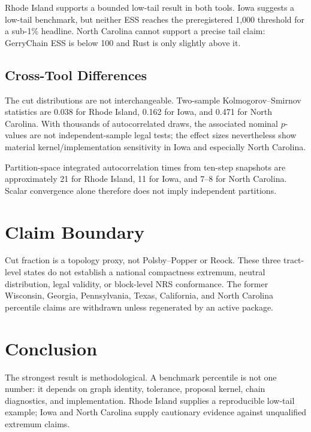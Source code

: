 Rhode Island supports a bounded low-tail result in both tools. Iowa suggests a
low-tail benchmark, but neither ESS reaches the preregistered 1,000 threshold
for a sub-1\% headline. North Carolina cannot support a precise tail claim:
GerryChain ESS is below 100 and Rust is only slightly above it.

\subsection{Cross-Tool Differences}

The cut distributions are not interchangeable. Two-sample Kolmogorov--Smirnov
statistics are 0.038 for Rhode Island, 0.162 for Iowa, and 0.471 for North
Carolina. With thousands of autocorrelated draws, the associated nominal
$p$-values are not independent-sample legal tests; the effect sizes nevertheless
show material kernel/implementation sensitivity in Iowa and especially North
Carolina.

Partition-space integrated autocorrelation times from ten-step snapshots are
approximately 21 for Rhode Island, 11 for Iowa, and 7--8 for North Carolina.
Scalar convergence alone therefore does not imply independent partitions.

\section{Claim Boundary}

Cut fraction is a topology proxy, not Polsby--Popper or Reock. These three
tract-level states do not establish a national compactness extremum, neutral
distribution, legal validity, or block-level NRS conformance. The former
Wisconsin, Georgia, Pennsylvania, Texas, California, and North Carolina
percentile claims are withdrawn unless regenerated by an active package.

\section{Conclusion}

The strongest result is methodological. A benchmark percentile is not one
number: it depends on graph identity, tolerance, proposal kernel, chain
diagnostics, and implementation. Rhode Island supplies a reproducible
low-tail example; Iowa and North Carolina supply cautionary evidence against
unqualified extremum claims.
